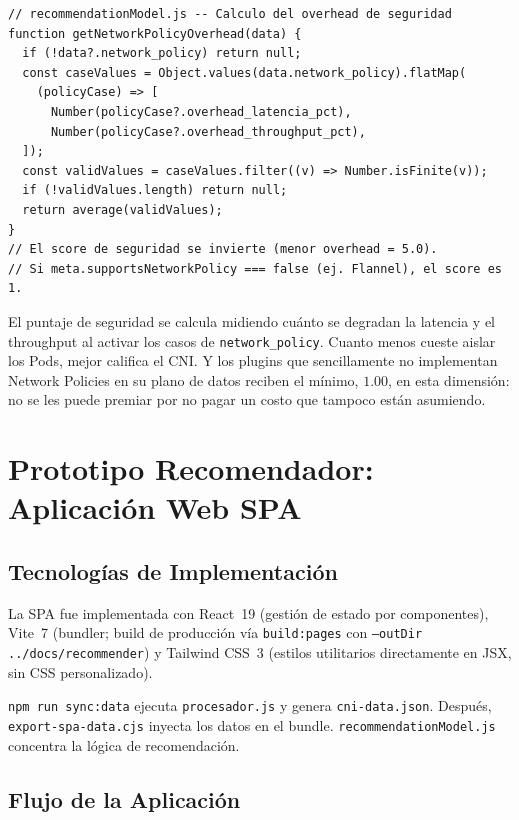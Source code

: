 \begin{lstlisting}
// recommendationModel.js -- Calculo del overhead de seguridad
function getNetworkPolicyOverhead(data) {
  if (!data?.network_policy) return null;
  const caseValues = Object.values(data.network_policy).flatMap(
    (policyCase) => [
      Number(policyCase?.overhead_latencia_pct),
      Number(policyCase?.overhead_throughput_pct),
  ]);
  const validValues = caseValues.filter((v) => Number.isFinite(v));
  if (!validValues.length) return null;
  return average(validValues);
}
// El score de seguridad se invierte (menor overhead = 5.0).
// Si meta.supportsNetworkPolicy === false (ej. Flannel), el score es 1.
\end{lstlisting}

El puntaje de seguridad se calcula midiendo cuánto se degradan la latencia y el throughput al activar los casos de \texttt{network\_policy}. Cuanto menos cueste aislar los Pods, mejor califica el CNI. Y los plugins que sencillamente no implementan Network Policies en su plano de datos reciben el mínimo, $1.00$, en esta dimensión: no se les puede premiar por no pagar un costo que tampoco están asumiendo.

\section{Prototipo Recomendador: Aplicación Web SPA}

\subsection{Tecnologías de Implementación}

La SPA fue implementada con React~19 (gestión de estado por componentes), Vite~7 (bundler; build de producción vía \texttt{build:pages} con \texttt{--outDir ../docs/recommender}) y Tailwind CSS~3 (estilos utilitarios directamente en JSX, sin CSS personalizado).

\texttt{npm run sync:data} ejecuta \texttt{procesador.js} y genera \texttt{cni-data.json}. Después, \texttt{export-spa-data.cjs} inyecta los datos en el bundle. \texttt{recommendationModel.js} concentra la lógica de recomendación.

\subsection{Flujo de la Aplicación}

